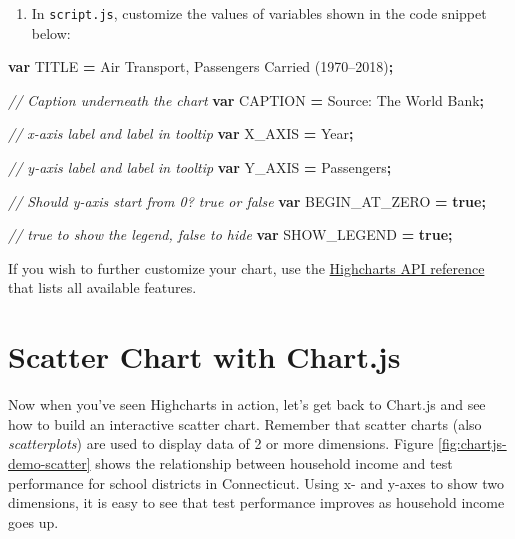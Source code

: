 \documentclass[
  english,
]{book}
\newenvironment{Shaded}{\begin{snugshade}}{\end{snugshade}}
\newcommand{\CommentTok}[1]{\textcolor[rgb]{0.56,0.35,0.01}{\textit{#1}}}
\newcommand{\KeywordTok}[1]{\textcolor[rgb]{0.13,0.29,0.53}{\textbf{#1}}}
\newcommand{\NormalTok}[1]{#1}
\newcommand{\OperatorTok}[1]{\textcolor[rgb]{0.81,0.36,0.00}{\textbf{#1}}}
\newcommand{\StringTok}[1]{\textcolor[rgb]{0.31,0.60,0.02}{#1}}
\providecommand{\tightlist}{%
  \setlength{\itemsep}{0pt}\setlength{\parskip}{0pt}}
\begin{document}
\begin{enumerate}
\def\labelenumi{\arabic{enumi}.}
\setcounter{enumi}{2}
\tightlist
\item
  In \texttt{script.js}, customize the values of variables shown in the code snippet below:
\end{enumerate}

\begin{Shaded}
\begin{Highlighting}[]
\KeywordTok{var}\NormalTok{ TITLE }\OperatorTok{=} \StringTok{\textquotesingle{}Air Transport, Passengers Carried (1970–2018)\textquotesingle{}}\OperatorTok{;}

\CommentTok{// Caption underneath the chart}
\KeywordTok{var}\NormalTok{ CAPTION }\OperatorTok{=} \StringTok{\textquotesingle{}Source: The World Bank\textquotesingle{}}\OperatorTok{;}

\CommentTok{// x{-}axis label and label in tooltip}
\KeywordTok{var}\NormalTok{ X\_AXIS }\OperatorTok{=} \StringTok{\textquotesingle{}Year\textquotesingle{}}\OperatorTok{;}

\CommentTok{// y{-}axis label and label in tooltip}
\KeywordTok{var}\NormalTok{ Y\_AXIS }\OperatorTok{=} \StringTok{\textquotesingle{}Passengers\textquotesingle{}}\OperatorTok{;}

\CommentTok{// Should y{-}axis start from 0? \textasciigrave{}true\textasciigrave{} or \textasciigrave{}false\textasciigrave{}}
\KeywordTok{var}\NormalTok{ BEGIN\_AT\_ZERO }\OperatorTok{=} \KeywordTok{true}\OperatorTok{;}

\CommentTok{// \textasciigrave{}true\textasciigrave{} to show the legend, \textasciigrave{}false\textasciigrave{} to hide}
\KeywordTok{var}\NormalTok{ SHOW\_LEGEND }\OperatorTok{=} \KeywordTok{true}\OperatorTok{;}
\end{Highlighting}
\end{Shaded}

If you wish to further customize your chart, use the \href{https://api.highcharts.com/highcharts/}{Highcharts API reference} that lists all available features.

\hypertarget{chartjs-scatter}{%
\section*{Scatter Chart with Chart.js}\label{chartjs-scatter}}

Now when you've seen Highcharts in action, let's get back to Chart.js and see how to build an interactive scatter chart. Remember that scatter charts (also \emph{scatterplots}) are used to display data of 2 or more dimensions. Figure \ref{fig:chartjs-demo-scatter} shows the relationship between household income and test performance
for school districts in Connecticut. Using x- and y-axes to show two dimensions, it is easy to see that test performance improves as household income goes up.
\end{document}
